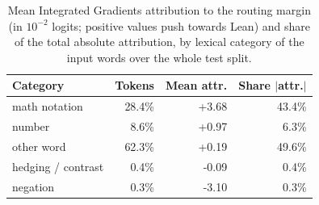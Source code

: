 \begin{table}[ht]
\centering
\small
\begin{tabular}{lrrr}
\hline
\textbf{Category} & \textbf{Tokens} & \textbf{Mean attr.} & \textbf{Share $|$attr.$|$} \\
\hline
math notation & 28.4\% & +3.68 & 43.4\% \\
number & 8.6\% & +0.97 & 6.3\% \\
other word & 62.3\% & +0.19 & 49.6\% \\
hedging / contrast & 0.4\% & -0.09 & 0.4\% \\
negation & 0.3\% & -3.10 & 0.3\% \\
\hline
\end{tabular}
\caption{Mean Integrated Gradients attribution to the routing margin (in $10^{-2}$ logits; positive values push towards Lean) and share of the total absolute attribution, by lexical category of the input words over the whole test split.}
\label{tab:ig_categories}
\end{table}
